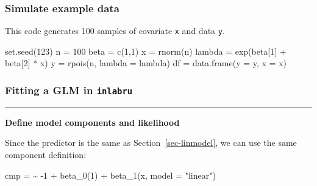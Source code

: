 \documentclass[
  letterpaper,
  DIV=11,
  numbers=noendperiod]{scrartcl}
\newenvironment{Shaded}{\begin{snugshade}}{\end{snugshade}}
\newcommand{\AttributeTok}[1]{\textcolor[rgb]{0.40,0.45,0.13}{#1}}
\newcommand{\DecValTok}[1]{\textcolor[rgb]{0.68,0.00,0.00}{#1}}
\newcommand{\ErrorTok}[1]{\textcolor[rgb]{0.68,0.00,0.00}{#1}}
\newcommand{\FunctionTok}[1]{\textcolor[rgb]{0.28,0.35,0.67}{#1}}
\newcommand{\NormalTok}[1]{\textcolor[rgb]{0.00,0.23,0.31}{#1}}
\newcommand{\OtherTok}[1]{\textcolor[rgb]{0.00,0.23,0.31}{#1}}
\newcommand{\SpecialCharTok}[1]{\textcolor[rgb]{0.37,0.37,0.37}{#1}}
\newcommand{\StringTok}[1]{\textcolor[rgb]{0.13,0.47,0.30}{#1}}
\begin{document}
\subsubsection{\texorpdfstring{\textbf{Simulate example
data}}{Simulate example data}}\label{simulate-example-data-2}

This code generates 100 samples of covariate \texttt{x} and data
\texttt{y}.

\begin{Shaded}
\begin{Highlighting}[]
\FunctionTok{set.seed}\NormalTok{(}\DecValTok{123}\NormalTok{)}
\NormalTok{n }\OtherTok{=} \DecValTok{100}
\NormalTok{beta }\OtherTok{=} \FunctionTok{c}\NormalTok{(}\DecValTok{1}\NormalTok{,}\DecValTok{1}\NormalTok{)}
\NormalTok{x }\OtherTok{=} \FunctionTok{rnorm}\NormalTok{(n)}
\NormalTok{lambda }\OtherTok{=} \FunctionTok{exp}\NormalTok{(beta[}\DecValTok{1}\NormalTok{] }\SpecialCharTok{+}\NormalTok{ beta[}\DecValTok{2}\NormalTok{] }\SpecialCharTok{*}\NormalTok{ x)}
\NormalTok{y }\OtherTok{=} \FunctionTok{rpois}\NormalTok{(n, }\AttributeTok{lambda  =}\NormalTok{ lambda)}
\NormalTok{df }\OtherTok{=} \FunctionTok{data.frame}\NormalTok{(}\AttributeTok{y =}\NormalTok{ y, }\AttributeTok{x =}\NormalTok{ x)  }
\end{Highlighting}
\end{Shaded}

\subsubsection{\texorpdfstring{Fitting a GLM in
\texttt{inlabru}}{Fitting a GLM in inlabru}}\label{fitting-a-glm-in-inlabru}

\begin{center}\rule{0.5\linewidth}{0.5pt}\end{center}

\textbf{Define model components and likelihood}

Since the predictor is the same as Section~\ref{sec-linmodel}, we can
use the same component definition:

\begin{Shaded}
\begin{Highlighting}[]
\NormalTok{cmp }\OtherTok{=}  \ErrorTok{\textasciitilde{}} \SpecialCharTok{{-}}\DecValTok{1} \SpecialCharTok{+} \FunctionTok{beta\_0}\NormalTok{(}\DecValTok{1}\NormalTok{) }\SpecialCharTok{+} \FunctionTok{beta\_1}\NormalTok{(x, }\AttributeTok{model =} \StringTok{"linear"}\NormalTok{)}
\end{Highlighting}
\end{Shaded}
\end{document}
